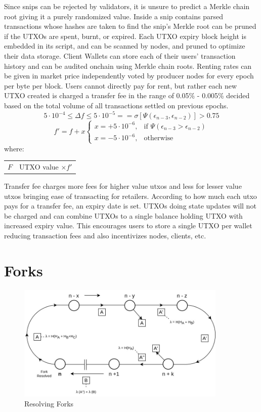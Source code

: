 \documentclass[a4paper,10pt]{article}
\makeatletter
\newenvironment{conditions}
  {\par\vspace{\abovedisplayskip}\noindent\begin{tabular}{>{$}l<{$} @{${}={}$} l}}
  {\end{tabular}\par\vspace{\belowdisplayskip}}
\makeatother
\begin{document}
\indent Since snips can be rejected by validators, it is unsure to predict a Merkle chain root giving it a purely randomized value. Inside a snip contains parsed transactions whose hashes are taken to find the snip's Merkle root can be pruned if the UTXOs are spent, burnt, or expired. Each UTXO expiry block height is embedded in its script, and can be scanned by nodes, and pruned to optimize their data storage. Client Wallets can store each of their users' transaction history and can be audited onchain using Merkle chain roots. Renting rates can be given in market price independently voted by producer nodes for every epoch per byte per block. Users cannot directly pay for rent, but rather each new UTXO created is charged a transfer fee in the range of 0.05\% - 0.005\% decided based on the total volume of all transactions settled on previous epochs.
\begin{equation}
5 \cdot 10^{-4} \leq \Delta f \leq 5 \cdot 10^{-5} == \sigma [\Psi (\epsilon_{n-3}, \epsilon_{n-2})] > 0.75
\end{equation}
\begin{equation}
f'=f+x \begin{cases}
x=+5 \cdot 10^{-6}, & \text{if } \Psi (\epsilon_{n-3} > \epsilon_{n-2})\\
x=-5 \cdot 10^{-6}, & \text{otherwise}
\end{cases}
\end{equation}
where:
\begin{conditions}
F & UTXO value $\times f'$ 
\end{conditions}

 Transfer fee charges more fees for higher value utxos and less for lesser value utxos bringing ease of transacting for retailers. According to how much each utxo pays for a transfer fee, an expiry date is set. UTXOs doing state updates will not be charged and can combine UTXOs to a single balance holding UTXO with increased expiry value. This encourages users to store a single UTXO per wallet reducing transaction fees and also incentivizes nodes, clients, etc.  
 
\section{Forks}

\begin{figure}[H]
\begin{center}
\includegraphics[width=10cm]{fork}
\caption{Resolving Forks}
\end{center}
\end{figure}
\end{document}
